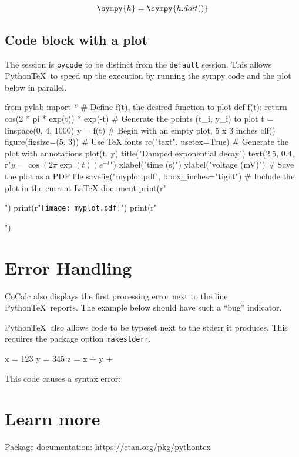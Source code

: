 \documentclass{scrartcl}
\newcommand{\pytex}{Python\TeX}
\begin{document}
\[\sympy{h}=\sympy{h.doit()}\]

\pagebreak

\subsection{Code block with a plot}

The session is \verb|pycode| to be distinct from the \verb|default| session.
This allows \pytex\ to speed up the execution by running the sympy code and the plot below in parallel.

\begin{pycode}[pycode]
from pylab import *
# Define f(t), the desired function to plot
def f(t):
  return cos(2 * pi * exp(t)) * exp(-t)
# Generate the points (t_i, y_i) to plot
t = linspace(0, 4, 1000)
y = f(t)
# Begin with an empty plot, 5 x 3 inches
clf()
figure(figsize=(5, 3))
# Use TeX fonts
rc("text", usetex=True)
# Generate the plot with annotations
plot(t, y)
title("Damped exponential decay")
text(2.5, 0.4, r"$y = \cos(2 \pi \exp(t)) e^{-t}$")
xlabel("time (s)")
ylabel("voltage (mV)")
# Save the plot as a PDF file
savefig("myplot.pdf", bbox_inches="tight")
# Include the plot in the current LaTeX document
print(r"\begin{center}")
print(r"\texttt{[image: myplot.pdf]}")
print(r"\end{center}")
\end{pycode}

\section{Error Handling}

CoCalc also displays the first processing error next to the line \pytex\ reports.
The example below should have such a ``bug'' indicator.

\pytex\ also allows code to be typeset next to the stderr it produces.
This requires the package option \verb|makestderr|.

\begin{pyblock}[errorsession][numbers=left]
x = 123
y = 345
z = x + y +
\end{pyblock}

This code causes a syntax error:

\stderrpythontex[verbatim][frame=single]

\section{Learn more}

Package documentation: \url{https://ctan.org/pkg/pythontex}
\end{document}
